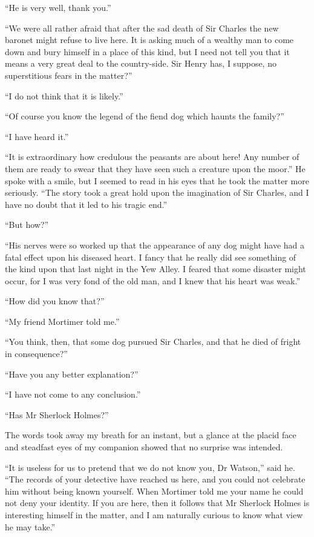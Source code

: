 \documentclass[paper=a5,BCOR=7mm,twoside,DIV=calc,12pt,usegeometry,openany,chapterprefix,endperiod,headings=big]{scrbook} %
\begin{document}
\enquote{He is very well, thank you.}

\enquote{We were all rather afraid that after the sad death of Sir Charles the new baronet might refuse to live here. It is asking much of a wealthy man to come down and bury himself in a place of this kind, but I need not tell you that it means a very great deal to the country-side. Sir Henry has, I suppose, no superstitious fears in the matter?}

\enquote{I do not think that it is likely.}

\enquote{Of course you know the legend of the fiend dog which haunts the family?}

\enquote{I have heard it.}

\enquote{It is extraordinary how credulous the peasants are about here! Any number of them are ready to swear that they have seen such a creature upon the moor.} He spoke with a smile, but I seemed to read in his eyes that he took the matter more seriously. \enquote{The story took a great hold upon the imagination of Sir Charles, and I have no doubt that it led to his tragic end.}

\enquote{But how?}

\enquote{His nerves were so worked up that the appearance of any dog might have had a fatal effect upon his diseased heart. I fancy that he really did see something of the kind upon that last night in the Yew Alley. I feared that some disaster might occur, for I was very fond of the old man, and I knew that his heart was weak.}

\enquote{How did you know that?}

\enquote{My friend Mortimer told me.}

\enquote{You think, then, that some dog pursued Sir Charles, and that he died of fright in consequence?}

\enquote{Have you any better explanation?}

\enquote{I have not come to any conclusion.}

\enquote{Has Mr Sherlock Holmes?}

The words took away my breath for an instant, but a glance at the placid face and steadfast eyes of my companion showed that no surprise was intended.

\enquote{It is useless for us to pretend that we do not know you, Dr Watson,} said he. \enquote{The records of your detective have reached us here, and you could not celebrate him without being known yourself. When Mortimer told me your name he could not deny your identity. If you are here, then it follows that Mr Sherlock Holmes is interesting himself in the matter, and I am naturally curious to know what view he may take.}
\end{document}
